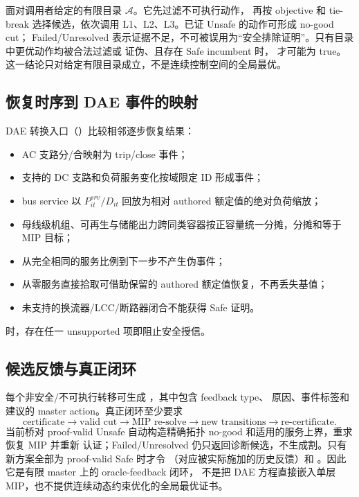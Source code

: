  面对调用者给定的有限目录 $\mathcal A$。它先过滤不可执行动作，
再按 objective 和 tie-break 选择候选，依次调用 L1、L2、L3。已证 Unsafe 的动作可形成 no-good cut；
Failed/Unresolved 表示证据不足，不可被误用为“安全排除证明”。只有目录中更优动作均被合法过滤或
证伪、且存在 Safe incumbent 时， 才可能为 true。
这一结论只对给定有限目录成立，不是连续控制空间的全局最优。

\subsection{恢复时序到 DAE 事件的映射}

DAE 转换入口（）比较相邻逐步恢复结果：
\begin{itemize}
 \item AC 支路分/合映射为 trip/close 事件；
 \item 支持的 DC 支路和负荷服务变化按域限定 ID 形成事件；
 \item bus service 以 $P^{srv}_{it}/D_{it}$ 回放为相对 authored 额定值的绝对负荷缩放；
 \item 母线级机组、可再生与储能出力跨同类容器按正容量统一分摊，分摊和等于 MIP 目标；
 \item 从完全相同的服务比例到下一步不产生伪事件；
 \item 从零服务直接拾取可借助保留的 authored 额定值恢复，不再丢失基值；
 \item 未支持的换流器/LCC/断路器闭合不能获得 Safe 证明。
\end{itemize}
 时，存在任一 unsupported 项即阻止安全授信。

\subsection{候选反馈与真正闭环}

每个非安全/不可执行转移可生成 ，其中包含 feedback type、
原因、事件标签和建议的 master action。真正闭环至少要求
\begin{equation}
 \text{certificate}\to\text{valid cut}\to\text{MIP re-solve}
 \to\text{new transitions}\to\text{re-certificate}.
\end{equation}
当前桥对 proof-valid Unsafe 自动构造精确拓扑 no-good 和适用的服务上界，重求恢复 MIP 并重新
认证；Failed/Unresolved 仍只返回诊断候选，不生成割。只有新方案全部为 proof-valid Safe 时才令
（对应被实际施加的历史反馈）和
。因此它是有限 master 上的 oracle-feedback 闭环，
不是把 DAE 方程直接嵌入单层 MIP，也不提供连续动态约束优化的全局最优证书。

